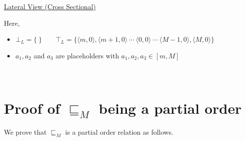 \documentclass[final,3p, review, times]{util/elsarticle}
\begin{document}
\centerline{\underline{\Large{Lateral View (Cross Sectional)}}}

Here,
\begin{itemize}
  \item $\bot_L=\big\{\ \big\}\qquad\top_L=\big\{\langle m,0\rangle,\langle m+1,0\rangle\ \cdots\ \langle 0,0\rangle\ \cdots\ \langle M-1,0\rangle,\langle M,0\rangle\big\}$
  \item $a_1,a_2$ and $a_3$ are placeholders with $a_1,a_2,a_3\in[m,M]$
\end{itemize}















\section{\\Proof of $\sqsubseteq_M$ being a partial order}
\label{app:interval_partial}

We prove that $\sqsubseteq_M$ is a partial order relation as follows.
\end{document}

